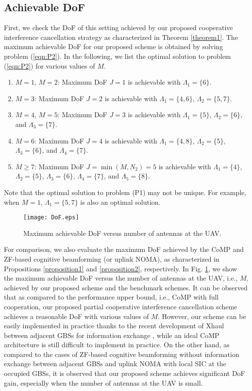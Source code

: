 \documentclass[onecolumn, draftclsnofoot, 12pt]{IEEEtran}
\begin{document}
\subsection{Achievable DoF}
First, we check the DoF of this setting achieved by our proposed cooperative interference cancellation strategy as characterized in Theorem \ref{theorem1}. The maximum achievable DoF for our proposed scheme is obtained by solving problem (\ref{eqn:P2}). In the following, we list the optimal solution to problem (\ref{eqn:P2}) for various values of $M$.
\begin{enumerate}
\item $M=1$, $M=2$: Maximum DoF $J=1$ is achievable with $\Lambda_1=\{6\}$.
\item $M=3$: Maximum DoF $J=2$ is achievable with $\Lambda_1=\{4,6\}$, $\Lambda_2=\{5,7\}$.
\item $M=4$, $M=5$: Maximum DoF $J=3$ is achievable with $\Lambda_1=\{5\}$, $\Lambda_2=\{6\}$, and $\Lambda_3=\{7\}$.
\item $M=6$: Maximum DoF $J=4$ is achievable with $\Lambda_1=\{4,8\}$, $\Lambda_2=\{5\}$, $\Lambda_3=\{6\}$, and $\Lambda_4=\{7\}$.
\item $M\geq7$: Maximum DoF $J=\min(M,N_2)=5$ is achievable with $\Lambda_1=\{4\}$, $\Lambda_2=\{5\}$, $\Lambda_3=\{6\}$, $\Lambda_4=\{7\}$, and $\Lambda_5=\{8\}$.
\end{enumerate}
Note that the optimal solution to problem (P1) may not be unique. For example, when $M=1$, $\Lambda_1=\{5,7\}$ is also an optimal solution.
\begin{figure}[t]
  \centering
  \texttt{[image: DoF.eps]}
  \caption{Maximum achievable DoF versus number of antennas at the UAV.}\label{DoF}
\end{figure}

For comparison, we also evaluate the maximum DoF achieved by the CoMP and ZF-based cognitive beamforming (or uplink NOMA), as characterized in Propositions \ref{proposition1} and \ref{proposition2}, respectively. In Fig. \ref{DoF}, we show the maximum achievable DoF versus the number of antennas at the UAV, i.e., $M$, achieved by our proposed scheme and the benchmark schemes. It can be observed that as compared to the performance upper bound, i.e., CoMP with full cooperation, our proposed partial cooperative interference cancellation scheme achieves a reasonable DoF with various values of $M$. However, our scheme can be easily implemented in practice thanks to the recent development of Xhaul between adjacent GBSs for information exchange \cite{Xhaul}, while an ideal CoMP architecture is still difficult to implement in practice. On the other hand, as compared to the cases of ZF-based cognitive beamforming without information exchange between adjacent GBSs and uplink NOMA with local SIC at the occupied GBSs, it is observed that our proposed scheme achieves significant DoF gain, especially when the number of antennas at the UAV is small.
\end{document}
